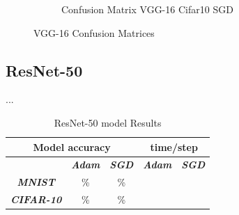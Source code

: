 \documentclass[conference]{IEEEtran}
\begin{document}
\begin{figure}[!htbp]
\begin{subfigure}[b]{0.22\textwidth}
        \caption{Confusion Matrix VGG-16 Cifar10 SGD}
        \label{fig:x matrix_VGG_CIFAR_SGD}
    \end{subfigure}
    \caption{VGG-16 Confusion Matrices}
    \label{fig:VGG Confusion Matrixis}
\end{figure}

\subsection{ResNet-50}
...
\begin{table}[!htbp]
    \caption{ResNet-50 model Results}
    \begin{center}
    \begin{tabular}{|c|c|c|c|c|}
    \cline{1-5} 
    \multicolumn{3}{|c|}{\textbf{Model accuracy}} & \multicolumn{2}{|c|}{\textbf{time/step}} \\
    \hline 
    \textit{} & \textbf{\textit{Adam}} & \textbf{\textit{SGD}} & \textbf{\textit{Adam}} & \textbf{\textit{SGD}} \\
    \hline
    \textbf{\textit{MNIST}} & \% & \% &  &  \\
    \hline
    \textbf{\textit{CIFAR-10}} & \% & \% &  &  \\
    \cline{1-5} 
    \end{tabular}
    \label{tab: ResNet-50 model accuracy}
    \end{center}
\end{table}
\end{document}
